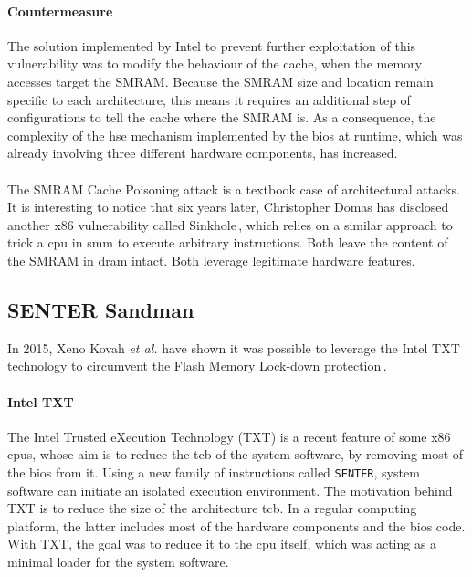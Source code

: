 \paragraph{Countermeasure}
%
The solution implemented by Intel to prevent further exploitation of this
vulnerability was to modify the behaviour of the cache, when the memory accesses
target the SMRAM.
%
Because the SMRAM size and location remain specific to each architecture, this
means it requires an additional step of configurations to tell the cache where
the SMRAM is.
%
As a consequence, the complexity of the \ac{hse} mechanism implemented by the
\ac{bios} at runtime, which was already involving three different hardware
components, has increased.

\paragraph{}
%
The SMRAM Cache Poisoning attack is a textbook case of architectural attacks.
%
It is interesting to notice that six years later, Christopher Domas has
disclosed another x86 vulnerability called Sinkhole\,\cite{domas2015sinkhole},
which relies on a similar approach to trick a \ac{cpu} in \ac{smm} to execute
arbitrary instructions.
%
Both leave the content of the SMRAM in \ac{dram} intact.
%
Both leverage legitimate hardware features.

\subsection{SENTER Sandman}
\label{subsec:usecase:hse:sandman}

In 2015, Xeno Kovah \emph{et al.} have shown it was possible to leverage the
Intel TXT technology to circumvent the Flash Memory Lock-down
protection\,\cite{kovah2015senter}.

\paragraph{Intel TXT}
The Intel Trusted eXecution Technology (TXT) is a recent feature of some x86
\acp{cpu}, whose aim is to reduce the \ac{tcb} of the system software, by
removing most of the \ac{bios} from it.
%
Using a new family of instructions called \texttt{SENTER}, system software can
initiate an isolated execution environment.
%
The motivation behind TXT is to reduce the size of the architecture \ac{tcb}.
%
In a regular computing platform, the latter includes most of the hardware
components and the \ac{bios} code.
%
With TXT, the goal was to reduce it to the \ac{cpu} itself, which was acting as
a minimal loader for the system software.

